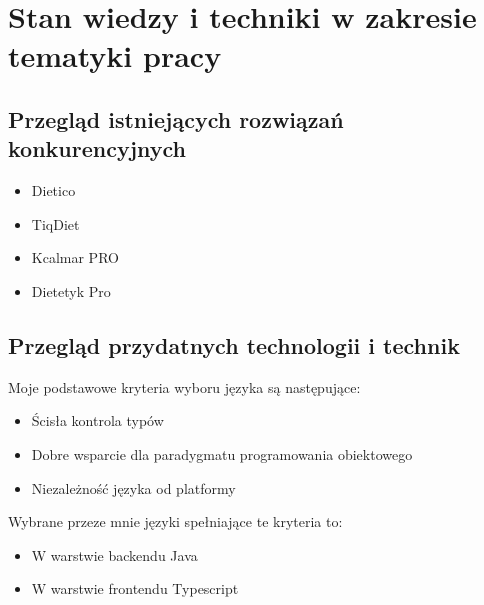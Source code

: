 \chapter{Stan wiedzy i techniki w zakresie tematyki pracy}
\section{Przegląd istniejących rozwiązań konkurencyjnych}
\begin{itemize}
    \item Dietico
    \item TiqDiet
    \item Kcalmar PRO
    \item Dietetyk Pro
\end{itemize}

\section{Przegląd przydatnych technologii i technik}
Moje podstawowe kryteria wyboru języka są następujące:

\begin{itemize}
    \item Ścisła kontrola typów
    \item Dobre wsparcie dla paradygmatu programowania obiektowego
    \item Niezależność języka od platformy
\end{itemize}

Wybrane przeze mnie języki spełniające te kryteria to:

\begin{itemize}
    \item W warstwie backendu Java \cite{java}
    \item W warstwie frontendu Typescript \cite{typescript}
\end{itemize}

